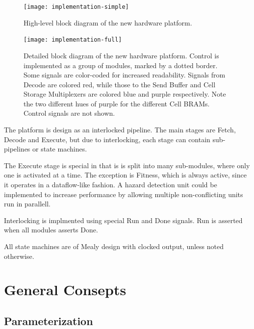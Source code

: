 \begin{figure}[!ht]
    \centering
    \texttt{[image: implementation-simple]}
    \caption[High-level system diagram]{High-level block diagram of the new hardware platform.}
    \label{fig:implementation-simple}
\end{figure}

\begin{figure}
    \centering
    \texttt{[image: implementation-full]}
    \caption[Detailed system diagram]{
        Detailed block diagram of the new hardware platform.
        Control is implemented as a group of modules, marked by a dotted border.
        Some signals are color-coded for increased readability.
        Signals from Decode are colored red, while those to the Send Buffer and Cell Storage Multiplexers are colored blue and purple respectively.
        Note the two different hues of purple for the different Cell BRAMs.
        Control signals are not shown.
    }
    \label{fig:implementation-full}
\end{figure}

The platform is design as an interlocked pipeline.
The main stages are Fetch, Decode and Execute, but due to interlocking, each stage can contain sub-pipelines or state machines.

The Execute stage is special in that is is split into many sub-modules, where only one is activated at a time.
The exception is Fitness, which is always active, since it operates in a dataflow-like fashion.
A hazard detection unit could be implemented to increase performance by allowing multiple non-conflicting units run in parallell.

Interlocking is implmented using special Run and Done signals.
Run is asserted when all modules asserts Done.

All state machines are of Mealy design with clocked output, unless noted otherwise.



\section{General Consepts}


\subsection{Parameterization}


